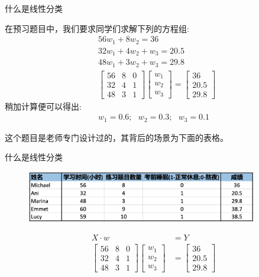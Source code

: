 \documentclass[handout]{ctexbeamer}
\begin{document}
\begin{frame}{什么是线性分类}
	\begin{example}
		在预习题目中，我们要求同学们求解下列的方程组:
	\begin{align*}
	& 56w_1 + 8 w_2 = 36 \\
	& 32 w_1+ 4 w_2 + w_3 = 20.5 \\
	& 48 w_1 + 3w_2 + w_3 = 29.8 \\
	& \begin{bmatrix}
		56 & 8 & 0 \\
		32 & 4 & 1 \\
		48 & 3 & 1 
	\end{bmatrix} \begin{bmatrix}
		w_1 \\
		w_2 \\
		w_3
	\end{bmatrix} = \begin{bmatrix}
		36 \\
		20.5 \\
		29.8 
	\end{bmatrix} 
\end{align*}
稍加计算便可以得出:
\begin{align*}
	w_1= 0.6; \ \ \ w_2 = 0.3; \ \ \ w_3 = 0.1 
\end{align*}
	\end{example}
	这个题目是老师专门设计过的，其背后的场景为下面的表格。
\end{frame}

\begin{frame}{什么是线性分类}
	\begin{figure}[H]
		\centering
		\includegraphics[width=0.9\textwidth]{fig/C1C2grade}
	\end{figure}
	\begin{example}
	\begin{align*}
		X \cdot w & = Y \\
		\begin{bmatrix}
		56 & 8 & 0 \\
		32 & 4 & 1 \\
		48 & 3 & 1 
	\end{bmatrix} \begin{bmatrix}
		w_1 \\
		w_2 \\
		w_3
	\end{bmatrix} & = \begin{bmatrix}
		36 \\
		20.5 \\
		29.8 
	\end{bmatrix}
	\end{align*}	
	\end{example}
\end{frame}
\end{document}
